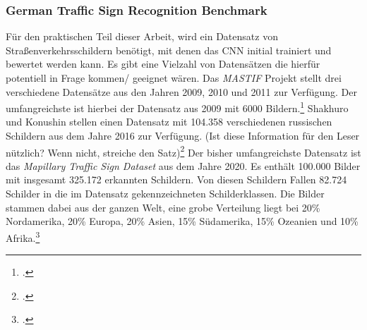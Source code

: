 \subsubsection{German Traffic Sign Recognition Benchmark}
Für den praktischen Teil dieser Arbeit, wird ein Datensatz von Straßenverkehrsschildern benötigt, mit denen das \ac{CNN} initial trainiert und bewertet werden kann. Es gibt eine Vielzahl von Datensätzen die hierfür potentiell in Frage kommen/ geeignet wären. Das \textit{\ac{MASTIF}} Projekt stellt drei verschiedene Datensätze aus den Jahren 2009, 2010 und 2011 zur Verfügung. Der umfangreichste ist hierbei der Datensatz aus 2009 mit 6000 Bildern.\footcite[Vgl.][S. 66-73]{vsegvic2010computer} Shakhuro und Konushin stellen einen Datensatz mit 104.358 verschiedenen russischen Schildern aus dem Jahre 2016 zur Verfügung. (Ist diese Information für den Leser nützlich? Wenn nicht, streiche den Satz)\footcite[Vgl.][S. 294-300]{rtsd} Der bisher umfangreichste Datensatz ist das \textit{Mapillary Traffic Sign Dataset} aus dem Jahre 2020. Es enthält 100.000 Bilder mit insgesamt 325.172 erkannten Schildern. Von diesen Schildern Fallen 82.724 Schilder in die im Datensatz gekennzeichneten Schilderklassen. Die Bilder stammen dabei aus der ganzen Welt, eine grobe Verteilung liegt bei 20\% Nordamerika, 20\% Europa, 20\% Asien, 15\% Südamerika, 15\% Ozeanien und 10\% Afrika.\footcite[Vgl.][S. 1-17]{ertlerMapillaryTrafficSign2020}

